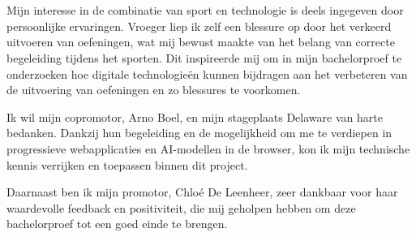 
\chapter*{}%
\label{ch:voorwoord}


Mijn interesse in de combinatie van sport en technologie is deels ingegeven door persoonlijke ervaringen. 
Vroeger liep ik zelf een blessure op door het verkeerd uitvoeren van oefeningen, wat mij bewust maakte van het belang van correcte begeleiding tijdens het sporten. 
Dit inspireerde mij om in mijn bachelorproef te onderzoeken hoe digitale technologieën kunnen bijdragen aan het verbeteren van de uitvoering van oefeningen en zo blessures te voorkomen.

Ik wil mijn copromotor, Arno Boel, en mijn stageplaats Delaware van harte bedanken. 
Dankzij hun begeleiding en de mogelijkheid om me te verdiepen in progressieve webapplicaties en AI-modellen in de browser, kon ik mijn technische kennis verrijken en toepassen binnen dit project.

Daarnaast ben ik mijn promotor, Chloé De Leenheer, zeer dankbaar voor haar waardevolle feedback en positiviteit, die mij geholpen hebben om deze bachelorproef tot een goed einde te brengen.

\lipsum[1-2]